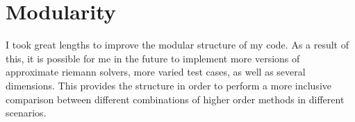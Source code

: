\section{Modularity}
I took great lengths to improve the modular structure of my code. As a result of this, it is possible for me in the future to implement more versions of approximate riemann solvers, more varied test cases, as well as several dimensions. This provides the structure in order to perform a more inclusive comparison between different combinations of higher order methods in different scenarios. 
